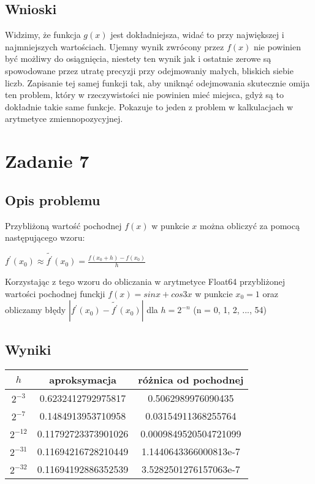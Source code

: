 \documentclass{article}
\begin{document}
\subsection{Wnioski}
    Widzimy, że funkcja $g(x)$ jest dokładniejsza, widać to przy największej i najmniejszych wartościach.
    Ujemny wynik zwrócony przez $f(x)$ nie powinien być możliwy do osiągnięcia, niestety ten wynik jak i ostatnie zerowe są spowodowane przez utratę precyzji przy odejmowaniy małych, bliskich siebie liczb.
    Zapisanie tej samej funkcji tak, aby uniknąć odejmowania skutecznie omija ten problem, który w rzeczywistości nie powinien mieć miejsca, gdyż są to dokładnie takie same funkcje.
    Pokazuje to jeden z problem w kalkulacjach w arytmetyce zmiennopozycyjnej.

\section{Zadanie 7}
\subsection{Opis problemu}
    Przybliżoną wartość pochodnej $f(x)$ w punkcie $x$ można obliczyć za pomocą następującego wzoru:\\
    \begin{center}
        $f^{'}(x_0)\approx\tilde{f^{'}}(x_0) = \frac{f(x_0+h) - f(x_0)}{h}$
    \end{center}
    Korzystając z tego wzoru do obliczania w arytmetyce Float64 przybliżonej wartości pochodnej funckji $f(x)=sinx+cos3x$ w punkcie $x_0 = 1$ oraz obliczamy błędy $|f^{'}(x_0) - \tilde{f^{'}}(x_0)|$ dla $h=2^{-n}$ (n = 0, 1, 2, ..., 54)
\subsection{Wyniki}
	\begin{center}
        \begin{tabular}{|c||c|c|}
        \hline
            $h$ & aproksymacja & różnica od pochodnej\\
            \hline\hline
            $2^{-3}$ & 0.6232412792975817 & 0.5062989976090435\\
            \hline
            $2^{-7}$ & 0.1484913953710958 & 0.03154911368255764\\
            \hline
            $2^{-12}$ & 0.11792723373901026 & 0.0009849520504721099\\
            \hline
            $2^{-31}$ & 0.11694216728210449 & 1.1440643366000813e-7\\
            \hline
            $2^{-32}$ & 0.11694192886352539 & 3.5282501276157063e-7\\
        \hline
        \end{tabular}
    \end{center}
\end{document}

